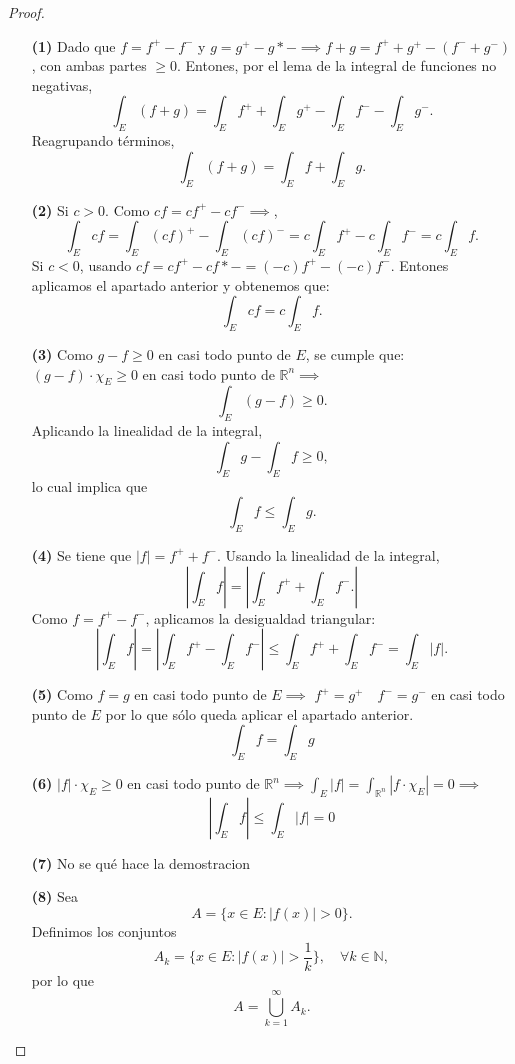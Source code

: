 \begin{proof}
    \leavevmode
    \begin{enumerate}
        \item[\textbf{(1)}] Dado que $f = f^+ - f^-$ y $g = g^+ - g*- \implies f + g = f^+ + g^+ - (f^- + g^-)$, con ambas partes $\geq 0$. Entones,
              por el lema de la integral de funciones no negativas,
              $$ \int_E (f+g) = \int_E f^+ + \int_E g^+ - \int_E f^- - \int_E g^-. $$
              Reagrupando términos,
              $$ \int_E (f+g) = \int_E f + \int_E g. $$

        \item[\textbf{(2)}]
              Si $ c > 0 $. Como $ c f = cf^+ - c f^- \implies$,
              $$ \int_E c f = \int_E (c f)^+ - \int_E (c f)^- = c \int_E f^+ - c \int_E f^- = c \int_E f. $$
              Si $ c < 0 $, usando $ c f = cf^+-cf*- = (-c)f^+ - (-c)f^-$. Entones aplicamos el apartado anterior y obtenemos que:
              $$ \int_E c f = c \int_E f. $$

        \item[\textbf{(3)}] Como $g - f \geq 0$ en casi todo punto de $E$, se cumple que: $(g-f)\cdot\chi_{E} \geq 0$ en casi todo punto de $\mathbb{R}^n \implies$
              $$ \int_E (g - f) \geq 0. $$
              Aplicando la linealidad de la integral,
              $$ \int_E g - \int_E f \geq 0, $$
              lo cual implica que
              $$ \int_E f \leq \int_E g. $$

        \item[\textbf{(4)}] Se tiene que $|f| = f^+ + f^-$. Usando la linealidad de la integral,
              $$ |\int_E f| = |\int_E f^+ + \int_E f^-. |$$
              Como $f = f^+ - f^-$, aplicamos la desigualdad triangular:
              $$ \left| \int_E f \right| = \left| \int_E f^+ - \int_E f^- \right| \leq \int_E f^+ + \int_E f^- = \int_E |f|. $$

        \item[\textbf{(5)}] Como $f = g$ en casi todo punto de $E \implies$  $f^+ = g^+ \quad f^- = g^-$ en casi todo punto de $E$ por lo que sólo queda aplicar el apartado anterior.
              $$ \int_E f = \int_E g $$

        \item[\textbf{(6)}] $|f|\cdot\chi_{E} \geq 0$ en casi todo punto de $\mathbb{R}^n \implies \int_{E}|f| = \int_{\mathbb{R}^n}|f\cdot\chi_{E}| = 0 \implies$
              $$ |\int_{E}f| \leq \int_{E}|f| = 0$$

        \item[\textbf{(7)}] No se qué hace la demostracion
        \item[\textbf{(8)}]
              Sea
              $$ A = \{ x \in E : |f(x)| > 0 \}. $$
              Definimos los conjuntos
              $$ A_k = \{ x \in E : |f(x)| > \frac{1}{k} \}, \quad \forall k \in \mathbb{N}, $$
              por lo que
              $$ A = \bigcup_{k=1}^{\infty} A_k. $$


\end{enumerate}
\end{proof}
